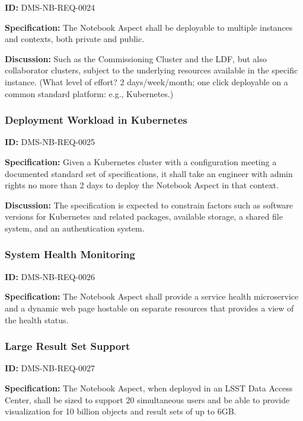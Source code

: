\documentclass[SE,toc,lsstdraft]{lsstdoc}
\begin{document}
\label{DMS-NB-REQ-0024}
\textbf{ID:} DMS-NB-REQ-0024

\textbf{Specification:}
The Notebook Aspect shall be deployable to multiple instances and contexts, both private and public.

\textbf{Discussion:}
Such as the Commissioning Cluster and the LDF, but also collaborator clusters, subject to the underlying resources available in the specific instance. (What level of effort? 2 days/week/month; one click deployable on a common standard platform: e.g., Kubernetes.)

\subsubsection{Deployment Workload in Kubernetes}

\label{DMS-NB-REQ-0025}
\textbf{ID:} DMS-NB-REQ-0025

\textbf{Specification:}
Given a Kubernetes cluster with a configuration meeting a documented standard set of specifications, it shall take an engineer with admin rights no more than 2 days to deploy the Notebook Aspect in that context.

\textbf{Discussion:}
The specification is expected to constrain factors such as software versions for Kubernetes and related packages, available storage, a shared file system, and an authentication system.

\subsubsection{System Health Monitoring}

\label{DMS-NB-REQ-0026}
\textbf{ID:} DMS-NB-REQ-0026

\textbf{Specification:}
The Notebook Aspect shall provide a service health microservice and a dynamic web page hostable on separate resources that provides a view of the health status.

\subsubsection{Large Result Set Support}

\label{DMS-NB-REQ-0027}
\textbf{ID:} DMS-NB-REQ-0027

\textbf{Specification:}
The Notebook Aspect, when deployed in an LSST Data Access Center, shall be sized to support 20 simultaneous users and be able to provide visualization for 10 billion objects and result sets of up to 6GB.
\end{document}
